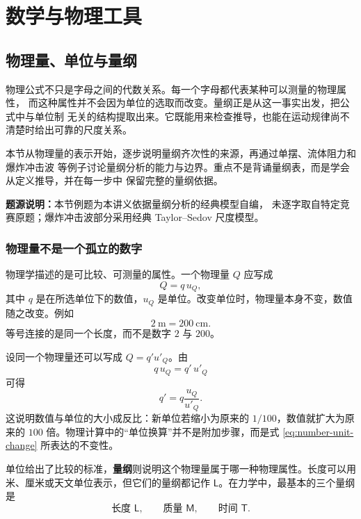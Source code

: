 \documentclass[UTF8,zihao=-4,oneside,openany]{ctexbook}
\numberwithin{equation}{section}
\begin{document}
\setcounter{page}{1}

\chapter{数学与物理工具}
\fi
\section{物理量、单位与量纲}

物理公式不只是字母之间的代数关系。每一个字母都代表某种可以测量的物理属性，
而这种属性并不会因为单位的选取而改变。量纲正是从这一事实出发，把公式中与单位制
无关的结构提取出来。它既能用来检查推导，也能在运动规律尚不清楚时给出可靠的尺度关系。

本节从物理量的表示开始，逐步说明量纲齐次性的来源，再通过单摆、流体阻力和爆炸冲击波
等例子讨论量纲分析的能力与边界。重点不是背诵量纲表，而是学会从定义推导，并在每一步中
保留完整的量纲依据。

{\small\color{TextGray}\noindent\textbf{题源说明：}本节例题为本讲义依据量纲分析的经典模型自编，
未逐字取自特定竞赛原题；爆炸冲击波部分采用经典 Taylor--Sedov 尺度模型。\par}

\subsection{物理量不是一个孤立的数字}

物理学描述的是可比较、可测量的属性。一个物理量 $Q$ 应写成
\begin{equation}
  Q=q\,u_Q,
  \label{eq:quantity-number-unit}
\end{equation}
其中 $q$ 是在所选单位下的数值，$u_Q$ 是单位。改变单位时，物理量本身不变，数值随之改变。例如
\[
  \SI{2}{\metre}=\SI{200}{\centi\metre}.
\]
等号连接的是同一个长度，而不是数字 $2$ 与 $200$。

设同一个物理量还可以写成 $Q=q'u'_Q$。由
\[
  q\,u_Q=q'\,u'_Q
\]
可得
\begin{equation}
  q'=q\frac{u_Q}{u'_Q}.
  \label{eq:number-unit-change}
\end{equation}
这说明数值与单位的大小成反比：新单位若缩小为原来的 $1/100$，数值就扩大为原来的
$100$ 倍。物理计算中的“单位换算”并不是附加步骤，而是式 \eqref{eq:number-unit-change}
所表达的不变性。

单位给出了比较的标准，\textbf{量纲}则说明这个物理量属于哪一种物理属性。长度可以用米、厘米或天文单位表示，但它们的量纲都记作 $\mathsf{L}$。在力学中，最基本的三个量纲是
\[
  \text{长度 }\mathsf{L},\qquad
  \text{质量 }\mathsf{M},\qquad
  \text{时间 }\mathsf{T}.
\]
\end{document}

